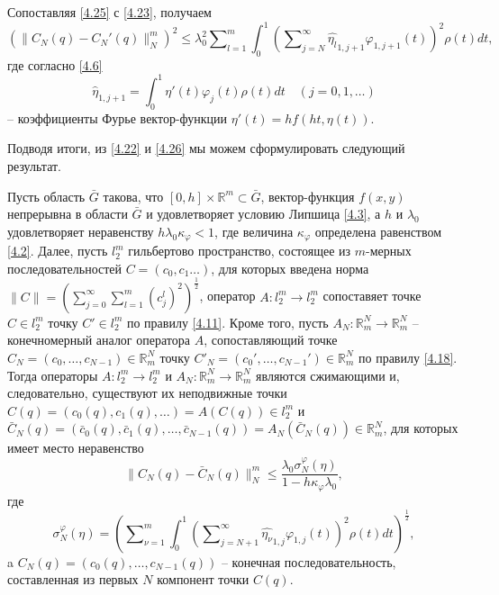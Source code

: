 Сопоставляя \eqref{4.25} с \eqref{4.23}, получаем
\begin{equation}\label{4.26}
(\|C_N(q)- C_N'(q)\|_N^m)^2\le \lambda_0^2\sum\nolimits_{l=1}^m\int_{0}^1\left(\sum\nolimits_{j=N}^\infty \widehat {\eta_l}_{1,j+1}\varphi_{1,j+1}(t)\right)^2\rho(t) dt,
\end{equation}
где согласно \eqref{4.6}
\begin{equation}\label{4.27}
\hat \eta_{1,j+1}=\int_{0}^1\eta'(t)\varphi_j(t)\rho(t)dt \quad(j=0,1,\ldots)
\end{equation}
-- коэффициенты Фурье вектор-функции $\eta'(t)=hf(ht,\eta(t))$.

Подводя итоги, из \eqref{4.22} и \eqref{4.26}  мы можем сформулировать следующий результат.
\begin{theorem}\label{th3} Пусть область $\bar G$ такова, что $[0,h]\times\mathbb{R}^m\subset \bar G$, вектор-функция $f(x,y)$ непрерывна в области $\bar G$ и удовлетворяет условию Липшица \eqref{4.3}, а $h$ и $\lambda_0$ удовлетворяет неравенству $h\lambda_0\kappa_\varphi<1$, где величина $\kappa_\varphi$ определена равенством \eqref{4.2}. Далее, пусть $l_2^m$ гильбертово пространство, состоящее из $m$-мерных последовательностей $C=(c_0,c_1\ldots)$, для которых введена норма $\|C\|=\left(\sum\nolimits_{j=0}^{\infty} \sum\nolimits_{l=1}^{m}(c_j^l)^2\right)^\frac12$,   оператор $A: l_2^m\to l_2^m$ сопоставяет точке $C\in l_2^m$ точку $C'\in l_2^m$ по правилу \eqref{4.11}. Кроме того, пусть $A_N:\mathbb{R}^N_m\to \mathbb{R}^N_m$ -- конечномерный аналог оператора $A$, сопоставляющий точке $C_N=(c_0,\ldots,c_{N-1})\in \mathbb{R}^N_m $ точку  $C'_N=(c_0',\ldots,c_{N-1}')\in \mathbb{R}^N_m $ по правилу \eqref{4.18}.
	Тогда операторы $A: l_2^m\to l_2^m$ и $A_N:\mathbb{R}^N_m\to \mathbb{R}^N_m$ являются сжимающими и, следовательно, существуют  их неподвижные точки $C(q)=(c_0(q),c_1(q),\ldots)=A(C(q))\in l_2^m$ и $\bar C_{N}(q)=(\bar c_0(q),\bar c_1(q),\ldots,\bar c_{N-1}(q))=A_N(\bar C_N(q))\in \mathbb{R}^N_m$, для которых имеет место неравенство
	\begin{equation}\label{4.28}
	\|C_N(q)-\bar C_N(q)\|_N^m\le \frac{\lambda_0 \sigma_N^\varphi(\eta)}{1-h\kappa_\varphi\lambda_0},
	\end{equation}
	где
	\begin{equation}\label{4.29}
	\sigma_N^\varphi(\eta)=\left(\sum\nolimits_{\nu=1}^m\int_{0}^1\left(\sum\nolimits_{j=N+1}^\infty \widehat {\eta_\nu}_{1,j}\varphi_{1,j}(t)\right)^2\rho(t) dt\right)^\frac12,
	\end{equation}
	a $C_N(q)=(c_0(q),\ldots,c_{N-1}(q))$ -- конечная последовательность, составленная из первых $N$ компонент точки  $C(q)$.
\end{theorem}


